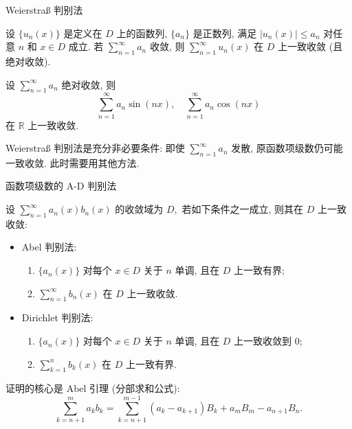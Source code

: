 
\begin{frame}{Weierstraß 判别法}

\begin{thm}
设 $\{u_n(x)\}$ 是定义在 $D$ 上的函数列, $\{a_n\}$ 是正数列, 满足 $|u_n(x)| \leqslant a_n$ 对任意 $n$ 和 $x \in D$ 成立. 若 $\sum_{n=1}^\infty a_n$ 收敛, 则 $\sum_{n=1}^\infty u_n(x)$ 在 $D$ 上一致收敛 (且绝对收敛).
\end{thm}

\pause

\begin{eg}
设 $\sum_{n=1}^\infty a_n$ 绝对收敛, 则
\[\sum_{n=1}^\infty a_n \sin(nx), \quad \sum_{n=1}^\infty a_n \cos(nx)\]
在 $\mathbb{R}$ 上一致收敛.
\end{eg}

\pause

\begin{attnblock}
Weierstraß 判别法是{\color{red}充分非必要}条件: 即使 $\sum_{n=1}^\infty a_n$ 发散, 原函数项级数仍可能一致收敛. 此时需要用其他方法.
\end{attnblock}

\end{frame}


\begin{frame}{函数项级数的 A-D 判别法}

\begin{thm}[A-D 判别法]
设 $\sum_{n=1}^\infty a_n(x) b_n(x)$ 的收敛域为 $D,$ 若如下条件之一成立, 则其在 $D$ 上一致收敛:
\pause
\begin{itemize}
\item {\color{red}Abel 判别法}:
  \begin{enumerate}
  \item $\{a_n(x)\}$ 对每个 $x \in D$ 关于 $n$ 单调, 且在 $D$ 上{\color{red}一致有界};
  \item $\sum_{n=1}^\infty b_n(x)$ 在 $D$ 上{\color{red}一致收敛}.
  \end{enumerate}
\pause
\item {\color{red}Dirichlet 判别法}:
  \begin{enumerate}
  \item $\{a_n(x)\}$ 对每个 $x \in D$ 关于 $n$ 单调, 且在 $D$ 上{\color{red}一致收敛到 $0$};
  \item $\sum_{k=1}^n b_k(x)$ 在 $D$ 上{\color{red}一致有界}.
  \end{enumerate}
\end{itemize}
\end{thm}

\pause

证明的核心是 Abel 引理 (分部求和公式):
\[\sum_{k=n+1}^m a_k b_k = \sum_{k=n+1}^{m-1} (a_k - a_{k+1}) B_k + a_m B_m - a_{n+1} B_n.\]

\end{frame}

